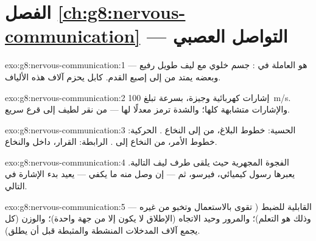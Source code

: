 \section*{الفصل \ref{ch:g8:nervous-communication} --- التواصل العصبي}

\begin{solution}{exo:g8:nervous-communication:1}
 هو  العاملة في : جسم خلوي مع
ليف طويل رفيع --- وبعضه يمتد من  إلى إصبع
القدم.  كابل يحزم آلاف هذه الألياف.
\end{solution}

\begin{solution}{exo:g8:nervous-communication:2}
إشارات كهربائية وجيزة، بسرعة تبلغ \qty{100}{m/s}.
والإشارات متشابهة كلها؛ والشدة ترمز معدلًا لها --- من
نقر لطيف إلى قرع سريع.
\end{solution}

\begin{solution}{exo:g8:nervous-communication:3}
 الحسية: خطوط البلاغ، من  إلى النخاع
.  الحركية: خطوط الأمر، من النخاع إلى
.  الرابطة: القرار، داخل  والنخاع.
\end{solution}

\begin{solution}{exo:g8:nervous-communication:4}
الفجوة المجهرية حيث يلقى طرف ليف   التالية.
يعبرها رسول كيميائي، فيرسو، ثم --- إن وصل منه ما يكفي ---
يعيد بدء الإشارة في  التالي.
\end{solution}

\begin{solution}{exo:g8:nervous-communication:5}
القابلية للضبط ( تقوى بالاستعمال وتخبو من غيره ---
وذلك هو التعلم)؛ والمرور وحيد الاتجاه (الإطلاق لا يكون
إلا من جهة واحدة)؛ والوزن (كل  يجمع آلاف المدخلات
المنشطة والمثبطة قبل أن يطلق).
\end{solution}

